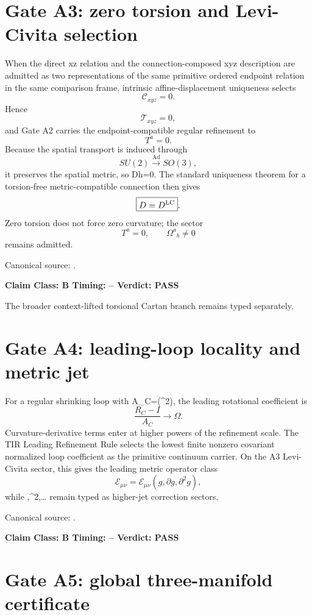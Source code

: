 \documentclass[11pt,a4paper,twoside]{book}
\def\({}%
\def\){}%
\theoremstyle{definition}
\newcommand{\vTwelveStatus}[3]{\par\noindent\textbf{Claim Class: #1 \quad Timing: #2 \quad Verdict: #3}\par}
\begin{document}
\section{Gate A3: zero torsion and Levi-Civita selection}

When the direct \(x\to z\) relation and the connection-composed
\(x\to y\to z\) description are admitted as two representations of the same
primitive ordered endpoint relation in the same comparison frame, intrinsic
affine-displacement uniqueness selects
\[
\boxed{\mathcal C_{xyz}=0}.
\]
Hence
\[
\mathcal T_{xyz}=0,
\]
and Gate A2 carries the endpoint-compatible regular refinement to
\[
\boxed{T^a=0}.
\]
Because the spatial transport is induced through
\[
SU(2)\xrightarrow{\operatorname{Ad}}SO(3),
\]
it preserves the spatial metric, so \(Dh=0\).  The standard uniqueness theorem
for a torsion-free metric-compatible connection then gives
\[
\boxed{D=D^{\rm LC}}.
\]
Zero torsion does not force zero curvature; the sector
\[
T^a=0,
\qquad
\Omega^a{}_b\ne0
\]
remains admitted.

Canonical source:
.
\vTwelveStatus{B}{--}{PASS}

The broader context-lifted torsional Cartan branch remains typed separately.

\section{Gate A4: leading-loop locality and metric jet}

For a regular shrinking loop with \(A_C=\Theta(\epsilon^2)\), the leading
rotational coefficient is
\[
\boxed{
\frac{R_C-I}{A_C}\longrightarrow\Omega.
}
\]
Curvature-derivative terms enter at higher powers of the refinement scale.
The TIR Leading Refinement Rule selects the lowest finite nonzero covariant
normalized loop coefficient as the primitive continuum carrier.  On the A3
Levi-Civita sector, this gives the leading metric operator class
\[
\boxed{
\mathcal E_{\mu\nu}
=\mathcal E_{\mu\nu}(g,\partial g,\partial^2g),
}
\]
while \(\nabla\Omega,\nabla^2\Omega,\ldots\) remain typed as higher-jet
correction sectors.

Canonical source:
.
\vTwelveStatus{B}{--}{PASS}

\section{Gate A5: global three-manifold certificate}
\end{document}
